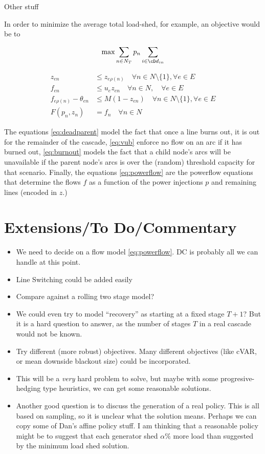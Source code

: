 Other stuff




In order to minimize the average total load-shed, for example, an
objective would be to 

\[ \max \sum_{n \in N_T} p_n \sum_{i \in \cD d_{in}} \]

\begin{align}
z_{en} &\leq z_{e\rho(n)} \quad \forall n \in N \setminus \{1\}, 
\forall e \in E \label{eq:deadparent} \\
f_{en} &\leq u_e z_{en} \quad \forall n \in N, \quad
\forall e \in E \label{eq:vub} \\
f_{e\rho(n)} - \theta_{en} &\leq M(1-z_{en}) \quad \forall n \in N
\setminus \{1\},  \forall e \in E \label{eq:burnout}\\
F(p_n,z_n) &= f_n \quad \forall n \in N \label{eq:powerflow}
\end{align}

The equations \eqref{eq:deadparent} model the fact that once a line
burns out, it is out for the remainder of the cascade, \eqref{eq:vub}
enforce no flow on an arc if it has burned out, \eqref{eq:burnout}
models the fact that a child node's arcs will be unavailable if the
parent node's arcs is over the (random) threshold capacity for that
scenario.  Finally, the equations \eqref{eq:powerflow} are the
powerflow equations that determine the flows $f$ as a function of the
power injections $p$ and remaining lines (encoded in $z$.)


\section*{Extensions/To Do/Commentary}

\begin{itemize}
\item We need to decide on a flow model \eqref{eq:powerflow}.  DC is
  probably all we can handle at this point.
\item Line Switching could be added easily
\item Compare against a rolling two stage model?
\item We could even try to model ``recovery'' as starting at a fixed
  stage $T+1$? But it is a hard question to answer, as the number of
  stages $T$ in a real cascade would not be known.
\item Try different (more robust) objectives.   Many different
  objectives (like cVAR, or mean downside blackout size) could be
  incorporated. 
\item This will be a {\em very} hard problem to solve, but maybe with
  some progresive-hedging type heuristics, we can get some reasonable
  solutions. 
\item Another good question is to discuss the generation of a real
  policy.  This is all based on sampling, so it is unclear what the
  solution means.  Perhaps we can copy some of Dan's affine policy
  stuff.  I am thinking that a reasonable policy might be to suggest
  that each generator shed $\alpha\%$ more load than suggested by the
  minimum load shed solution.
\end{itemize}


